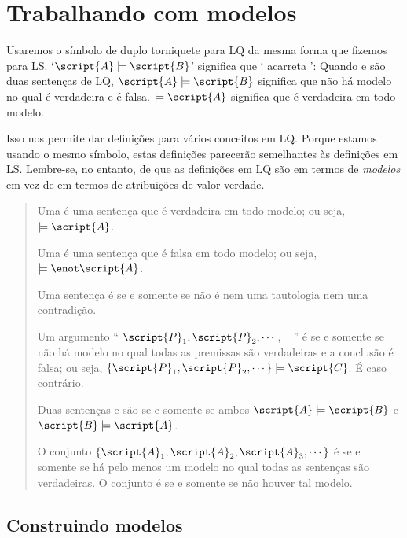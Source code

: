 \section{Trabalhando com modelos}
\label{sec.UsingModels}

Usaremos o símbolo de duplo torniquete para LQ da mesma forma que fizemos para LS. `$\script{A}\models\script{B}$' significa que ` acarreta ': Quando  e  são duas sentenças de LQ, $\script{A}\models\script{B}$ significa que não há modelo no qual  é verdadeira e  é falsa. $\models\script{A}$ significa que  é verdadeira em todo modelo.

Isso nos permite dar definições para vários conceitos em LQ. Porque estamos usando o mesmo símbolo, estas definições parecerão semelhantes às definições em LS. Lembre-se, no entanto, de que as definições em LQ são em termos de \emph{modelos} em vez de em termos de atribuições de valor-verdade.

\begin{quote}
Uma  é uma sentença  que é verdadeira em todo modelo; ou seja,  $\models\script{A}$.

Uma  é uma sentença  que é falsa em todo modelo; ou seja, $\models\enot\script{A}$.

Uma sentença é  se e somente se não é nem uma tautologia nem uma contradição.

Um argumento `` $\script{P}_1, \script{P}_2, \cdots$, \therefore\  '' é  se e somente se não há modelo no qual todas as premissas são verdadeiras e a conclusão é falsa; ou seja, $\{\script{P}_1,\script{P}_2,\cdots\}\models\script{C}$. É  caso contrário.

Duas sentenças  e  são  se e somente se ambos $\script{A}\models\script{B}$ e $\script{B}\models\script{A}$.

O conjunto $\{\script{A}_1,\script{A}_2,\script{A}_3,\cdots\}$ é  se e somente se há pelo menos um modelo no qual todas as sentenças são verdadeiras. O conjunto é  se e somente se não houver tal modelo.

\end{quote}

\subsection{Construindo modelos}

